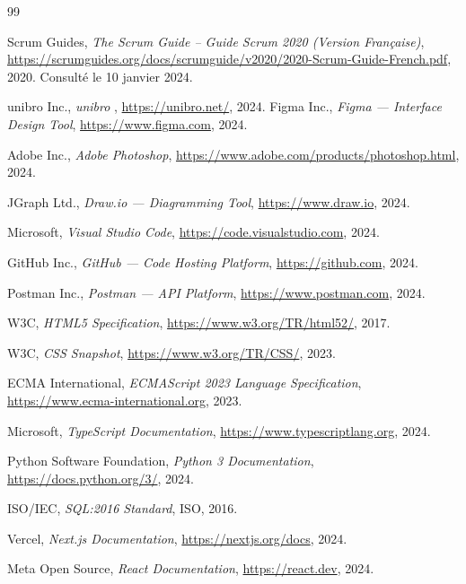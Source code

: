 

\begin{thebibliography}{99}


Scrum Guides, \textit{The Scrum Guide -- Guide Scrum 2020 (Version Française)}, \url{https://scrumguides.org/docs/scrumguide/v2020/2020-Scrum-Guide-French.pdf}, 2020. Consulté le 10 janvier 2024.

unibro Inc., \textit{unibro }, \url{https://unibro.net/}, 2024.
Figma Inc., \textit{Figma — Interface Design Tool}, \url{https://www.figma.com}, 2024.

Adobe Inc., \textit{Adobe Photoshop}, \url{https://www.adobe.com/products/photoshop.html}, 2024.

JGraph Ltd., \textit{Draw.io — Diagramming Tool}, \url{https://www.draw.io}, 2024.

Microsoft, \textit{Visual Studio Code}, \url{https://code.visualstudio.com}, 2024.

GitHub Inc., \textit{GitHub — Code Hosting Platform}, \url{https://github.com}, 2024.

Postman Inc., \textit{Postman — API Platform}, \url{https://www.postman.com}, 2024.

W3C, \textit{HTML5 Specification}, \url{https://www.w3.org/TR/html52/}, 2017.

W3C, \textit{CSS Snapshot}, \url{https://www.w3.org/TR/CSS/}, 2023.

ECMA International, \textit{ECMAScript 2023 Language Specification}, \url{https://www.ecma-international.org}, 2023.

Microsoft, \textit{TypeScript Documentation}, \url{https://www.typescriptlang.org}, 2024.

Python Software Foundation, \textit{Python 3 Documentation}, \url{https://docs.python.org/3/}, 2024.

ISO/IEC, \textit{SQL:2016 Standard}, ISO, 2016.

Vercel, \textit{Next.js Documentation}, \url{https://nextjs.org/docs}, 2024.

Meta Open Source, \textit{React Documentation}, \url{https://react.dev}, 2024.


\end{thebibliography}
